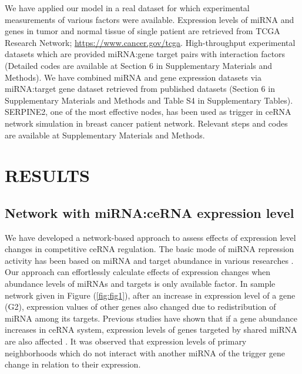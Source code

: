\documentclass[a4,center,fleqn]{NAR}
\begin{document}
We have applied our model in a real dataset for which experimental
measurements of various factors were available. Expression levels of
miRNA and genes in tumor and normal tissue of single patient are
retrieved from TCGA Research Network; \url{https://www.cancer.gov/tcga}.
High-throughput experimental datasets which are provided miRNA:gene
target pairs with interaction factors
\citep{helwak_mapping_2013, moore_mirnatarget_2015} (Detailed codes are
available at Section 6 in Supplementary Materials and Methods). We have
combined miRNA and gene expression datasets via miRNA:target gene
dataset retrieved from published datasets
\citep{helwak_mapping_2013, moore_mirnatarget_2015} (Section 6 in
Supplementary Materials and Methods and Table S4 in Supplementary
Tables). SERPINE2, one of the most effective nodes, has been used as
trigger in ceRNA network simulation in breast cancer patient network.
Relevant steps and codes are available at Supplementary Materials and
Methods.

\section{\texorpdfstring{\textbf{RESULTS}}{}}

\subsection{Network with miRNA:ceRNA expression level}

We have developed a network-based approach to assess effects of
expression level changes in competitive ceRNA regulation. The basic mode
of miRNA repression activity has been based on miRNA and target
abundance in various researches
\citep{arvey_target_2010, denzler_assessing_2014}. Our approach can
effortlessly calculate effects of expression changes when abundance
levels of miRNAs and targets is only available factor. In sample network
given in Figure (\ref{fig:fig1}), after an increase in expression level
of a gene (G2), expression values of other genes also changed due to
redistribution of miRNA among its targets. Previous studies have shown
that if a gene abundance increases in ceRNA system, expression levels of
genes targeted by shared miRNA are also affected
\citep{lai_understanding_2016, salmena_cerna_2011, tay_multilayered_2014}.
It was observed that expression levels of primary neighborhoods which do
not interact with another miRNA of the trigger gene change in relation
to their expression.
\end{document}
